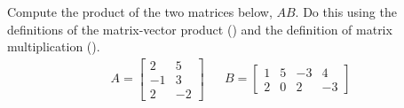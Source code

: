 Compute the product of the two matrices below, $AB$.  Do this using the definitions of the matrix-vector product () and the definition of matrix multiplication ().
%
\begin{align*}
A=
\begin{bmatrix}
2&5\\
-1&3\\
2&-2
\end{bmatrix}
&&
B=\begin{bmatrix}
1&5&-3&4\\
2&0&2&-3
\end{bmatrix}
\end{align*}
